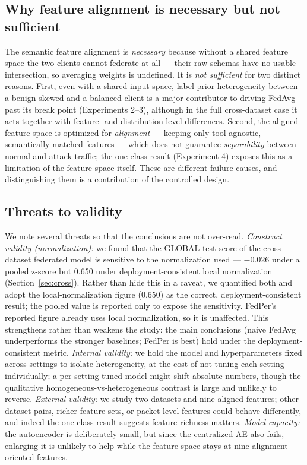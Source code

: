 \documentclass[11pt,a4paper]{article}
\begin{document}
\subsection{Why feature alignment is necessary but not sufficient}
The semantic feature alignment is \emph{necessary} because without a shared feature
space the two clients cannot federate at all --- their raw schemas have no usable
intersection, so averaging weights is undefined. It is \emph{not sufficient} for
two distinct reasons. First, even with a shared input
space, label-prior heterogeneity between a benign-skewed and a balanced client is
a major contributor to driving FedAvg past its break point (Experiments 2--3),
although in the full cross-dataset case it acts together with feature- and
distribution-level differences. Second, the aligned feature space is optimized for
\emph{alignment} --- keeping only tool-agnostic, semantically matched features ---
which does not guarantee \emph{separability} between normal and attack traffic;
the one-class result (Experiment 4) exposes this as a limitation of the feature
space itself. These are different failure causes, and distinguishing them is a
contribution of the controlled design.

\subsection{Threats to validity}
We note several threats so that the conclusions are not over-read.
\emph{Construct validity (normalization):} we found that the GLOBAL-test score of
the cross-dataset federated model is sensitive to the normalization used ---
\(-0.026\) under a pooled z-score but 0.650 under deployment-consistent local
normalization (Section~\ref{sec:cross}). Rather than hide this in a caveat, we
quantified both and adopt the local-normalization figure (0.650) as the correct,
deployment-consistent result; the pooled value is reported only to expose the
sensitivity. FedPer's reported figure already uses local normalization, so it is
unaffected. This strengthens rather than weakens the study: the main conclusions
(naive FedAvg underperforms the stronger baselines; FedPer is best) hold under the
deployment-consistent metric. \emph{Internal validity:} we hold the model and
hyperparameters fixed across settings to isolate heterogeneity, at the cost of not
tuning each setting individually; a per-setting tuned model might shift absolute
numbers, though the qualitative homogeneous-vs-heterogeneous contrast is large and
unlikely to reverse. \emph{External validity:} we study two datasets and nine
aligned features; other dataset pairs, richer feature sets, or packet-level features could
behave differently, and indeed the one-class result suggests feature richness
matters. \emph{Model capacity:} the autoencoder is deliberately small, but since
the centralized AE also fails, enlarging it is unlikely to help while the feature
space stays at nine alignment-oriented features.
\end{document}
